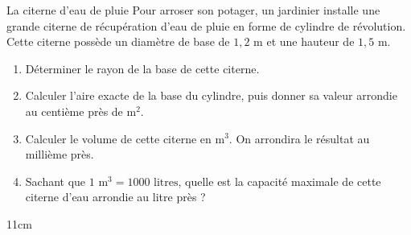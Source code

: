 \documentclass[a4paper]{book}
\begin{document}
    \begin{exerciceTitre}{La citerne d'eau de pluie}
        Pour arroser son potager, un jardinier installe une grande citerne de récupération d'eau de pluie en forme de cylindre de révolution. 
        Cette citerne possède un diamètre de base de $1,2\text{ m}$ et une hauteur de $1,5\text{ m}$.
        
        \begin{enumerate}
            \item Déterminer le rayon de la base de cette citerne.
            \item Calculer l'aire exacte de la base du cylindre, puis donner sa valeur arrondie au centième près de $\text{m}^2$.
            \item Calculer le volume de cette citerne en $\text{m}^3$. On arrondira le résultat au millième près.
            \item Sachant que $1\text{ m}^3 = 1000\text{ litres}$, quelle est la capacité maximale de cette citerne d'eau arrondie au litre près ?
        \end{enumerate}
    \end{exerciceTitre}
    
    \begin{ZoneReponse}{11cm}
    \end{ZoneReponse}
\end{document}
